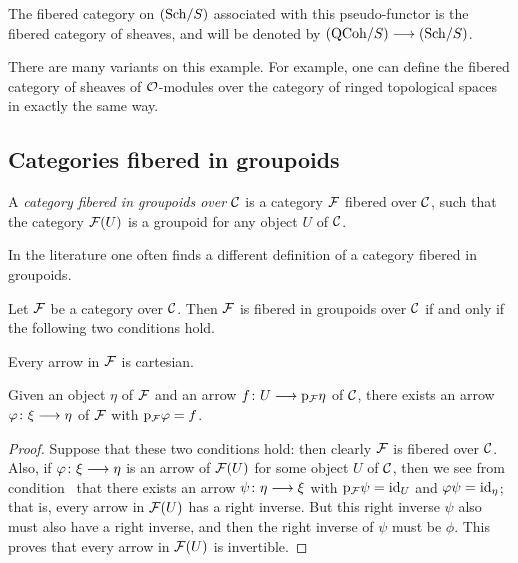 \begin{3   FIBERED CATEGORIES}
\begin{3.2 Examples of fibered categories}
The fibered category on $({\mathrm{Sch}/S})$ associated with this pseudo-functor is the fibered category of \qc sheaves, and will be denoted by $\catqc{S} \arr \catsch{S}$.

There are many variants on  this example. For example, one can define the fibered category of sheaves of $\mathcal{O}$-modules over the category of ringed topological spaces in exactly the same way.









\end{3.2 Examples of fibered categories}
\begin{3.3 Categories fibered in groupoids}
\setcounter{section}{2}
\section{Categories fibered in groupoids}

\begin{definition} A \emph{category fibered in groupoids over $\mathcal{C}$} is a category $\mathcal{F}$ fibered over $\mathcal{C}$, such that the category $\mathcal{F}(U)$ is a groupoid for any object $U$ of $\mathcal{C}$.
\end{definition}

In the literature one often finds a different definition of a category fibered in groupoids.

\begin{proposition} Let $\mathcal{F}$ be a category over $\mathcal{C}$. Then $\mathcal{F}$ is fibered in groupoids over $\mathcal{C}$ if and only if the following two conditions hold.

\begin{enumeratei}
 Every arrow in $\mathcal{F}$ is cartesian.

 Given an object $\eta$ of $\mathcal{F}$ and an arrow $f \colon U \arr \p_\cF \eta$ of $\mathcal{C}$, there exists an arrow $\phi \colon \xi \arr \eta$ of $\mathcal{F}$ with $\mathrm{p}_{\mathcal{F}} \varphi = f$.
\end{enumeratei}
\end{proposition}

\begin{proof} Suppose that these two conditions hold: then clearly $\mathcal{F}$ is fibered over $\mathcal{C}$. Also, if $\phi\colon \xi \arr \eta $ is an arrow of $\mathcal{F}(U)$ for some object $U$ of $\mathcal{C}$, then we see from condition~ that there exists an arrow $\psi\colon \eta \arr \xi$ with $\mathrm{p}_{\mathcal{F}} \psi = \mathrm{id}_U$ and $\varphi\psi = \mathrm{id}_\eta$; that is, every arrow in $\mathcal{F}(U)$ has a right inverse. But this right inverse $\psi$ also must also have a right inverse, and then the right inverse of $\psi$ must be $\phi$. This proves that every arrow in $\mathcal{F}(U)$ is invertible.


\end{proof}
\end{3.3 Categories fibered in groupoids}
\end{3   FIBERED CATEGORIES}
